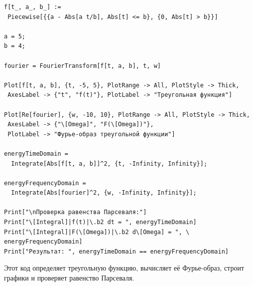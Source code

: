 \documentclass[a4paper,12pt]{article}
\begin{document}
\begin{lstlisting}[caption=Фурье-образ треугольной функции и проверка равенства Парсеваля]
f[t_, a_, b_] := 
 Piecewise[{{a - Abs[a t/b], Abs[t] <= b}, {0, Abs[t] > b}}]

a = 5;
b = 4;

fourier = FourierTransform[f[t, a, b], t, w]

Plot[f[t, a, b], {t, -5, 5}, PlotRange -> All, PlotStyle -> Thick, 
 AxesLabel -> {"t", "f(t)"}, PlotLabel -> "Треугольная функция"]

Plot[Re[fourier], {w, -10, 10}, PlotRange -> All, PlotStyle -> Thick, 
 AxesLabel -> {"\[Omega]", "F(\[Omega])"}, 
 PlotLabel -> "Фурье-образ треугольной функции"]

energyTimeDomain = 
  Integrate[Abs[f[t, a, b]]^2, {t, -Infinity, Infinity}];

energyFrequencyDomain = 
  Integrate[Abs[fourier]^2, {w, -Infinity, Infinity}];

Print["\nПроверка равенства Парсеваля:"]
Print["\[Integral]|f(t)|\.b2 dt = ", energyTimeDomain]
Print["\[Integral]|F(\[Omega])|\.b2 d\[Omega] = ", \
energyFrequencyDomain]
Print["Результат: ", energyTimeDomain == energyFrequencyDomain]
\end{lstlisting}
Этот код определяет треугольную функцию, вычисляет её Фурье-образ, строит графики и проверяет равенство Парсеваля.
\end{document}
